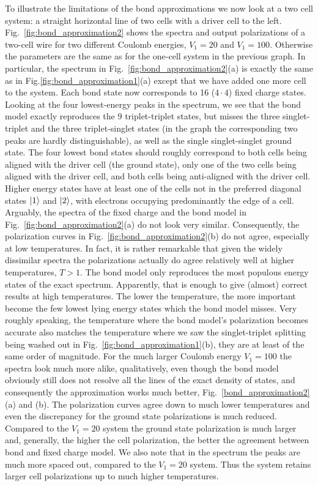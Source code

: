 To illustrate the limitations of the bond approximations we now look at a two
cell system: a straight horizontal line of two cells with a driver cell to the
left. Fig.~\ref{fig:bond_approximation2} shows the spectra and output
polarizations of a two-cell wire for two different Coulomb energies, $V_1 = 20$
and $V_1 = 100$. Otherwise the parameters are the same as for the one-cell
system in the previous graph. In particular, the spectrum in
Fig.~\ref{fig:bond_approximation2}(a) is exactly the same as in
Fig.\ref{fig:bond_approximation1}(a) except that we have added one more cell to
the system. Each bond state now corresponds to 16 ($4 \cdot 4$) fixed charge
states. Looking at the four lowest-energy peaks in the spectrum, we see that the
bond model exactly reproduces the 9 triplet-triplet states, but misses the three
singlet-triplet and the three triplet-singlet states (in the graph the
corresponding two peaks are hardly distinguishable), as well as the single
singlet-singlet ground state. The four lowest bond states should roughly
correspond to both cells being aligned with the driver cell (the ground state),
only one of the two cells being aligned with the driver cell, and both cells
being anti-aligned with the driver cell. Higher energy states have at least one
of the cells not in the preferred diagonal states $\left|1\right>$ and $\left|2\right>$, with
electrons occupying predominantly the edge of a cell. Arguably, 
the spectra of the fixed charge and the bond model in
Fig.~\ref{fig:bond_approximation2}(a) do not look very similar. Consequently,
the polarization curves in Fig.~\ref{fig:bond_approximation2}(b) do not agree,
especially at low temperatures. In fact, it is rather remarkable that given the
widely dissimilar spectra the polarizations actually do agree relatively well at higher
temperatures, $T > 1$. The bond model only reproduces the most populous energy
states of the exact spectrum. Apparently, that is enough to give (almost)
correct results at high temperatures. The lower the temperature, the more
important become the few lowest lying energy states which the bond model misses.
Very roughly speaking, the temperature where the bond model's polarization
becomes accurate also matches the temperature where we saw the singlet-triplet
splitting being washed out in Fig.~\ref{fig:bond_approximation1}(b), they are at
least of the same order of magnitude. For the much larger Coulomb energy $V_1 =
100$ the spectra look much more alike, qualitatively, even though the bond model
obviously still does not resolve all the lines of the exact density of states,
and consequently the approximation works much better,
Fig.~\ref{bond_approximation2}(a) and (b). The polarization curves agree down to
much lower temperatures and even the discrepancy for the ground state
polarizations is much reduced. Compared to the $V_1 = 20$ system the ground
state polarization is much larger and, generally, the higher the cell
polarization, the better the agreement between bond and fixed charge model. We
also note that in the spectrum the peaks are much more spaced out, compared to
the $V_1 = 20$ system. Thus the system retains larger cell polarizations up to
much higher temperatures.

